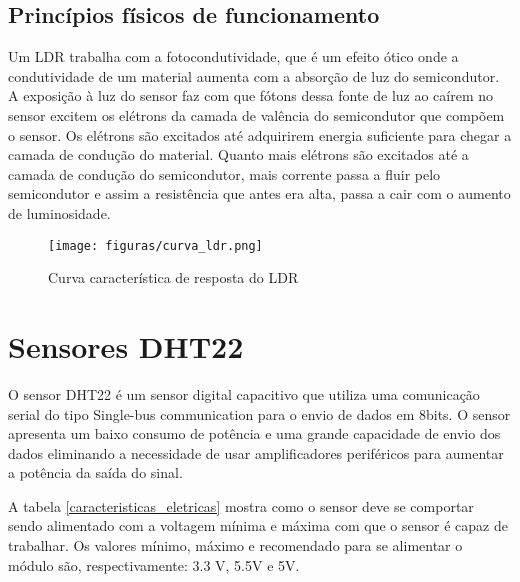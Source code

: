 \subsection{Princípios físicos de funcionamento}

Um LDR trabalha com a fotocondutividade, que é um efeito ótico onde a condutividade de um material aumenta com a absorção de luz do semicondutor. A exposição à luz do sensor faz com que fótons dessa fonte de luz ao caírem no sensor excitem os elétrons da camada de valência do semicondutor que compõem o sensor. Os elétrons são excitados até adquirirem energia suficiente para chegar a camada de condução do material. Quanto mais elétrons são excitados até a camada de condução do semicondutor, mais corrente passa a fluir pelo semicondutor e assim a resistência que antes era alta, passa a cair com o aumento de luminosidade.

\begin{figure}[H]
	\centering
	\texttt{[image: figuras/curva\_ldr.png]}
	\caption{Curva característica de resposta do LDR} \label{curva_ldr}
\end{figure}

\section{Sensores DHT22}

O sensor DHT22 é um sensor digital capacitivo que utiliza uma comunicação serial do tipo Single-bus communication para o envio de dados em 8bits. O sensor apresenta um baixo consumo de potência e uma grande capacidade de envio dos dados eliminando a necessidade de usar amplificadores periféricos para aumentar a potência da saída do sinal\cite{liu2018}.

A tabela \ref{caracteristicas_eletricas} mostra como o sensor deve se comportar sendo alimentado com a voltagem mínima e máxima com que o sensor é capaz de trabalhar. Os valores mínimo, máximo e recomendado para se alimentar o módulo são, respectivamente: 3.3 V, 5.5V e 5V.

